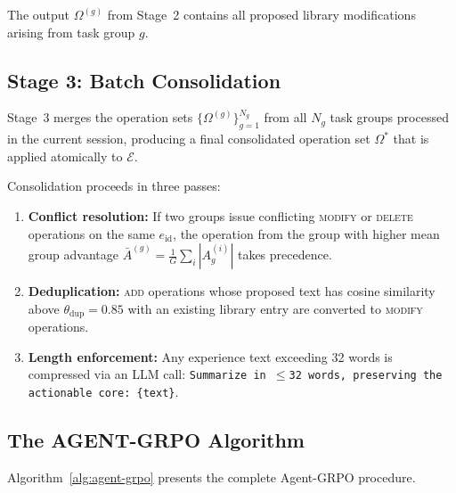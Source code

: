 The output $\Omega^{(g)}$ from Stage~2 contains all proposed library
modifications arising from task group $g$.

\subsection{Stage 3: Batch Consolidation}
\label{sec:stage3}

Stage~3 merges the operation sets $\{\Omega^{(g)}\}_{g=1}^{N_g}$ from all
$N_g$ task groups processed in the current session, producing a final
consolidated operation set $\Omega^*$ that is applied atomically to $\mathcal{E}$.

Consolidation proceeds in three passes:

\begin{enumerate}[leftmargin=1.5em]
    \item \textbf{Conflict resolution:} If two groups issue conflicting
          \textsc{modify} or \textsc{delete} operations on the same $e_{\text{id}}$,
          the operation from the group with higher mean group advantage
          $\bar{A}^{(g)} = \frac{1}{G}\sum_i |A^{(i)}_g|$ takes precedence.
    \item \textbf{Deduplication:} \textsc{add} operations whose proposed text
          has cosine similarity above $\theta_{\text{dup}} = 0.85$ with an
          existing library entry are converted to \textsc{modify} operations.
    \item \textbf{Length enforcement:} Any experience text exceeding 32 words
          is compressed via an LLM call: \texttt{Summarize in $\leq$32 words,
          preserving the actionable core: \{text\}}.
\end{enumerate}

\subsection{The AGENT-GRPO Algorithm}
\label{sec:algorithm}

Algorithm~\ref{alg:agent-grpo} presents the complete Agent-GRPO procedure.

